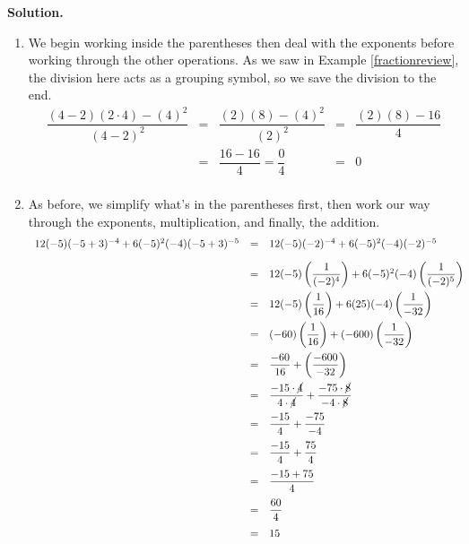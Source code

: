 \begin{ex}
\begin{multicols}{2}
\end{multicols}


{\bf Solution.}

\begin{enumerate}

\item  We begin working inside the parentheses then deal with the exponents before working through the other operations.  As we saw in Example \ref{fractionreview}, the division here acts as a grouping symbol, so we save the division to the end.\[ \begin{array}{rclcl}

\dfrac{(4-2)(2 \cdot 4)-(4)^2}{(4-2)^2} & = & \dfrac{(2)(8)-(4)^2}{(2)^2} & = & \dfrac{(2)(8)-16}{4} \\ [10pt]
                                        & = & \dfrac{16-16}{4} = \dfrac{0}{4} & = & 0 \\ \end{array}\]

\item  As before, we simplify what's in the parentheses first, then work our way through the exponents, multiplication, and finally, the addition.\[ \begin{array}{rclr}

12(-5)(-5+3)^{-4}+6(-5)^2(-4)(-5+3)^{-5} & = & 12(-5)(-2)^{-4} + 6(-5)^{2}(-4)(-2)^{-5} \\ [10pt]
                                         & = & 12(-5)\left(\dfrac{1}{(-2)^4}\right) + 6(-5)^{2}(-4)\left(\dfrac{1}{(-2)^5}\right)& \\ [10pt]
                                        
                                         & = & 12(-5)\left(\dfrac{1}{16}\right) + 6(25)(-4)\left(\dfrac{1}{-32}\right)& \\ [10pt]
																				
																				& = & (-60)\left(\dfrac{1}{16}\right) + (-600)\left(\dfrac{1}{-32}\right)& \\ [10pt]

	& = & \dfrac{-60}{16} + \left(\dfrac{-600}{-32}\right)&  \\ [10pt]
		& = & \dfrac{-15\cdot \cancel{4}}{4 \cdot \cancel{4}} + \dfrac{-75 \cdot \cancel{8}}{-4 \cdot \cancel{8}} & \\ [10pt]
		& = & \dfrac{-15}{4} + \dfrac{-75}{-4} & \\ [10pt]
			& = & \dfrac{-15}{4} + \dfrac{75}{4} & \\ [10pt]
				& = & \dfrac{-15 + 75}{4} & \\ [10pt]
				& = & \dfrac{60}{4} & \\ [10pt]
	       & = & 15 & \\  \end{array}\]
				

\end{enumerate}
\end{ex}
